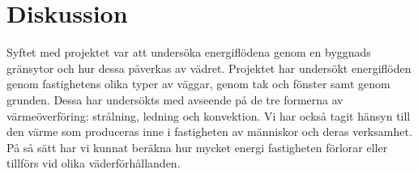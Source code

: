 \chapter{Diskussion}

Syftet med projektet var att undersöka energiflödena genom en byggnads gränsytor och hur dessa påverkas av vädret. Projektet har undersökt energiflöden genom fastighetens olika typer av väggar, genom tak och fönster samt genom grunden. Dessa har undersökts med avseende på de tre formerna av värmeöverföring: strålning, ledning och konvektion. Vi har också tagit hänsyn till den värme som produceras inne i fastigheten av människor och deras verksamhet. På så sätt har vi kunnat beräkna hur mycket energi fastigheten förlorar eller tillförs vid olika väderförhållanden.







